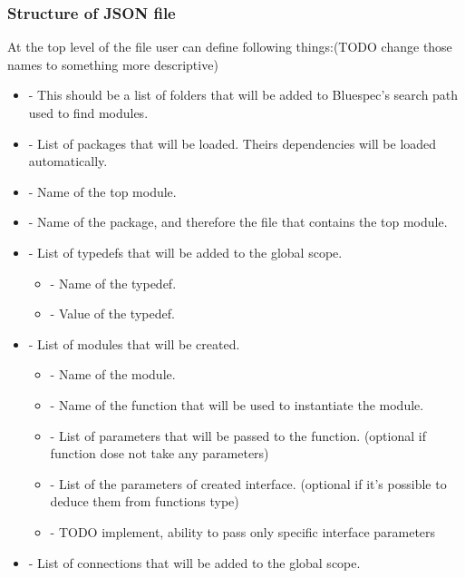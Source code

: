 \documentclass[14pt]{report}
\begin{document}
\subsubsection*{Structure of JSON file}
At the top level of the file user can define following things:(TODO change those names to something more descriptive)
\begin{itemize}
    \item {} - This should be a list of folders that will be added to Bluespec's search path used to find modules.
    \item {} - List of packages that will be loaded. Theirs dependencies will be loaded automatically.
    \item {} - Name of the top module.
    \item {} - Name of the package, and therefore the file that contains the top module.
    \item {} - List of typedefs that will be added to the global scope. \\
    \begin{itemize}
        \item {} - Name of the typedef.
        \item {} - Value of the typedef.
    \end{itemize}
    \item {} - List of modules that will be created. \\
    \begin{itemize}
        \item {} - Name of the module.
        \item {} - Name of the function that will be used to instantiate the module.
        \item {} - List of parameters that will be passed to the function. (optional if function dose not take any parameters)
        \item {} - List of the parameters of created interface. (optional if it's possible to deduce them from functions type)
        \item {} - TODO implement, ability to pass only specific interface parameters
    \end{itemize}
    \item {} - List of connections that will be added to the global scope. \\
    \begin{itemize}

\end{itemize}
\end{itemize}
\end{document}

